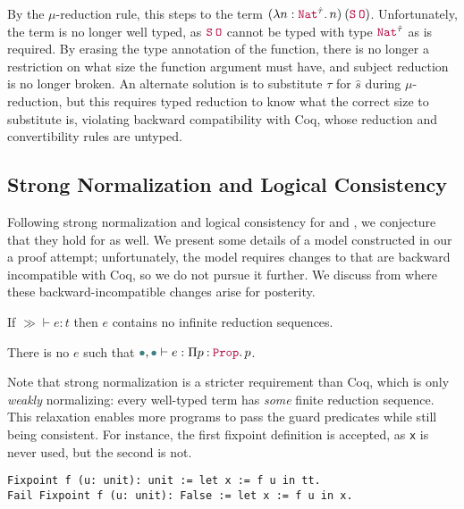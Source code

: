 By the $\mu$-reduction rule, this steps to the term $\app{(\abs{n}{\Nat^{\hat{\tau}}}{n})}{(\app{\Succ}{\Zero})}$.
Unfortunately, the term is no longer well typed, as $\app{\Succ}{\Zero}$ cannot be typed with type $\Nat^{\hat{\tau}}$ as is required.
By erasing the type annotation of the function,
there is no longer a restriction on what size the function argument must have,
and subject reduction is no longer broken.
An alternate solution is to substitute $\tau$ for $\hat{s}$ during $\mu$-reduction,
but this requires typed reduction to know what the correct size to substitute is,
violating backward compatibility with Coq,
whose reduction and convertibility rules are untyped.

\subsection{Strong Normalization and Logical Consistency}\label{sec:metatheory:sn}

Following strong normalization and logical consistency for \CIChatminus and \CChatomega,
we conjecture that they hold for \lang as well.
We present some details of a model constructed in our a proof attempt;
unfortunately, the model requires changes to \lang that are backward
incompatible with Coq, so we do not pursue it further.
We discuss from where these backward-incompatible changes arise for posterity.

\begin{conjecture}\label{thm:metatheory:sn}
  If $\gg \vdash e : t$ then $e$ contains no infinite
  reduction sequences.
\end{conjecture}

\begin{conjecture}\label{thm:metatheory:lc}
  There is no $e$ such that $\mt, \mt \vdash e : \prod{p}{\Prop}{p}$.
\end{conjecture}

Note that strong normalization is a stricter requirement than Coq, which is only \emph{weakly} normalizing:
every well-typed term has \emph{some} finite reduction sequence.
This relaxation enables more programs to pass the guard predicates while still being consistent.
For instance, the first fixpoint definition is accepted, as \texttt{x} is never used,
but the second is not.

\begin{verbatim}
Fixpoint f (u: unit): unit := let x := f u in tt.
Fail Fixpoint f (u: unit): False := let x := f u in x.
\end{verbatim}

